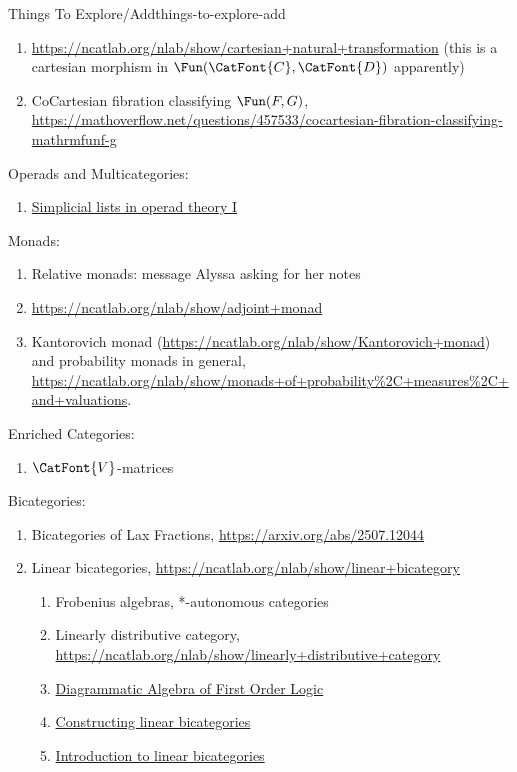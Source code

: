 \begin{remark}{Things To Explore/Add}{things-to-explore-add}
\begin{enumerate}
        \item \url{https://ncatlab.org/nlab/show/cartesian+natural+transformation} (this is a cartesian morphism in $\Fun(\CatFont{C},\CatFont{D})$ apparently)
        \item CoCartesian fibration classifying $\Fun(F,G)$, \url{https://mathoverflow.net/questions/457533/cocartesian-fibration-classifying-mathrmfunf-g}
    \end{enumerate}
    Operads and Multicategories:
    \begin{enumerate}
        \item \href{https://arxiv.org/abs/2405.10072}{Simplicial lists in operad theory I}
    \end{enumerate}
    Monads:
    \begin{enumerate}
        \item Relative monads: message Alyssa asking for her notes
        \item \url{https://ncatlab.org/nlab/show/adjoint+monad}
        \item Kantorovich monad (\url{https://ncatlab.org/nlab/show/Kantorovich+monad}) and probability monads in general, \url{https://ncatlab.org/nlab/show/monads+of+probability\%2C+measures\%2C+and+valuations}.
    \end{enumerate}
    Enriched Categories:
    \begin{enumerate}
        \item $\CatFont{V}$-matrices
    \end{enumerate}
    Bicategories:
    \begin{enumerate}
        \item Bicategories of Lax Fractions, \url{https://arxiv.org/abs/2507.12044}
        \item Linear bicategories, \url{https://ncatlab.org/nlab/show/linear+bicategory}
            \begin{enumerate}
                \item Frobenius algebras, *-autonomous categories
                \item Linearly distributive category, \url{https://ncatlab.org/nlab/show/linearly+distributive+category}
                \item \href{https://arxiv.org/abs/2401.07055}{Diagrammatic Algebra of First Order Logic}
                \item \href{https://arxiv.org/abs/2209.05693}{Constructing linear bicategories}
                \item \href{https://www.math.mcgill.ca/rags/bicats/bicat.pdf}{Introduction to linear bicategories}

\end{enumerate}
\end{enumerate}
\end{remark}
